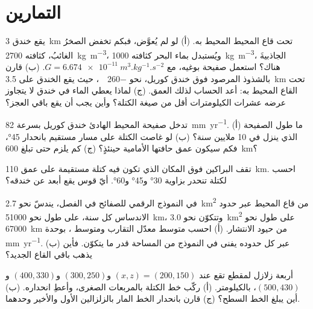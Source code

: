 \section{التمارين}

\begin{exercise}[$\star$]\label{exo:b1:active-margins:1}
يقع خندق \qty{3}{km} تحت قاع المحيط المحيط به. (أ) لو لم يُعوَّض، فبكم تخفض الصخرُ الغائبُ، كثافته \qty{2700}{kg.m^{-3}}، ويُستبدل بماء البحر كثافته \qty{1000}{kg.m^{-3}}، الجاذبيةَ هناك؟ استعمل صفيحة بوغيه، مع $G = \qty{6.674e-11}{m^3.kg^{-1}.s^{-2}}$. (ب) قارن بالشذوذ المرصود فوق خندق كوريل، نحو \qty{-260}{\milli\gal}، حيث يقع الخندق على \qty{3.5}{km} تحت القاع المحيط به: أعد الحساب لذلك العمق. (ج) لماذا يعطي الماء في خندق لا يتجاوز عرضه عشرات الكيلومترات أقل من صيغة الكتلة؟ وأين يجب أن يقع باقي العجز؟
\end{exercise}

\begin{exercise}[$\star$]\label{exo:b1:active-margins:2}
تدخل صفيحة المحيط الهادئ خندق كوريل بسرعة \qty{82}{mm.yr^{-1}}. (أ) ما طول الصفيحة الذي ينزل في 10 ملايين سنة؟ (ب) لو غاصت الكتلة على مسار مستقيم بانحدار \ang{45}، فكم سيكون عمق حافتها الأمامية حينئذٍ؟ (ج) كم يلزم حتى تبلغ \qty{600}{km}؟
\end{exercise}

\begin{exercise}[$\star$]\label{exo:b1:active-margins:3}
تقف البراكين فوق المكان الذي تكون فيه كتلة مستقيمة على عمق \qty{110}{km}. احسب  لكتلة تنحدر بزاوية \ang{30} و\ang{45} و\ang{60}. أيّ قوس يقع أبعد عن خندقه؟
\end{exercise}

\begin{exercise}[$\star$]\label{exo:b1:active-margins:4}
في النموذج الرقمي للصفائح في الفصل، يندسّ نحو \qty{2.7}{km^2} من قاع المحيط عبر حدود الاندساس كل سنة، على طول نحو \qty{51000}{km}، وتتكوّن نحو \qty{3.0}{km^2} على طول نحو \qty{67000}{km} من حيود الانتشار. (أ) احسب متوسط معدّل التقارب ومتوسط ، بوحدة \unit{mm.yr^{-1}}. (ب) عبر كل حدوده يفنى في النموذج من المساحة قدر ما يتكوّن. فأين يذهب باقي القاع الجديد؟
\end{exercise}

\begin{exercise}[$\star\star$]\label{exo:b1:active-margins:5}
أربعة زلازل لمقطع تقع عند $(x, z) = (200, 150)$ و$(300, 250)$ و$(400, 330)$ و$(500, 430)$، بالكيلومتر. (أ) ركّب خط الكتلة بالمربعات الصغرى، وأعطِ انحداره. (ب) أين يبلغ الخط السطح؟ (ج) قارن بانحدار الخط المار بالزلزالين الأول والأخير وحدهما.
\end{exercise}

